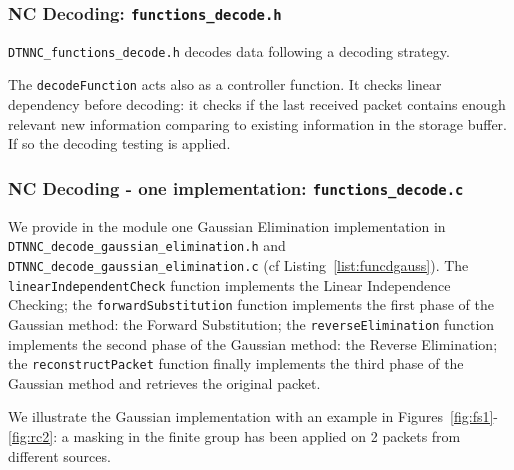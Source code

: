 \documentclass[a4paper,twoside]{article}
\begin{document}
\subsubsection{NC Decoding: \texttt{functions\_decode.h}}

\texttt{DTNNC\_functions\_decode.h} decodes data following a decoding strategy.

The \texttt{decodeFunction} acts also as a controller function. It checks linear dependency before decoding: it checks if the last received packet contains enough relevant new information comparing to existing information in the storage buffer. If so the decoding testing is applied.



\subsubsection{NC Decoding - one implementation: \texttt{functions\_decode.c}}

We provide in the module one Gaussian Elimination implementation in \texttt{DTNNC\_decode\_gaussian\_elimination.h} and \texttt{DTNNC\_decode\_gaussian\_elimination.c} (cf Listing~\ref{list:funcdgauss}). The \texttt{linearIndependentCheck} function implements the Linear Independence Checking; the \texttt{forwardSubstitution} function implements the first phase of the Gaussian method: the Forward Substitution; the \texttt{reverseElimination} function implements the second phase of the Gaussian method: the Reverse Elimination; the \texttt{reconstructPacket} function finally implements the third phase of the Gaussian method and retrieves the original packet.



We illustrate the Gaussian implementation with an example in Figures~\ref{fig:fs1}-\ref{fig:rc2}: a masking in the finite group  has been applied on 2 packets from different sources.
\end{document}
